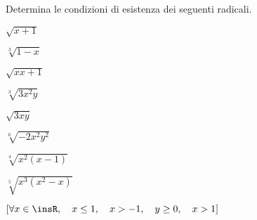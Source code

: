 \begin{esercizio}
 \label{ese:2.11}
Determina le condizioni di esistenza dei seguenti radicali.
 \begin{multicols}{4}
 \begin{enumeratea}
 \item $\sqrt{x+1}$
 \item $\sqrt[3]{1-x}$
 \item $\sqrt{x{x+1}}$
 \item $\sqrt[3]{3x^2y}$
 \item $\sqrt{3xy}$
 \item $\sqrt[6]{-2x^2y^2}$
 \item $\sqrt[4]{x^2(x-1)}$
 \item $\sqrt[5]{x^3(x^2-x)}$
 \end{enumeratea}
 \end{multicols}
\vspace*{-8pt}
$[\forall x\in \insR,\quad x\le 1,\quad x>-1,\quad y\ge 0,\quad x>1]$
\end{esercizio}

